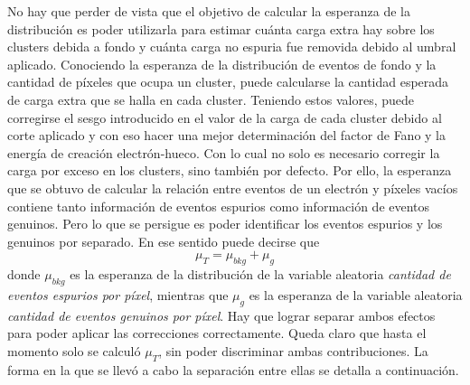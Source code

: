 No hay que perder de vista que el objetivo de calcular la esperanza de la distribución es poder utilizarla para estimar cuánta carga extra hay sobre los clusters debida a fondo y cuánta carga no espuria fue removida debido al umbral aplicado. 
%
Conociendo la esperanza de la distribución de eventos de fondo y la cantidad de píxeles que ocupa un cluster, puede calcularse la cantidad esperada de carga extra que se halla en cada cluster. Teniendo estos valores, puede corregirse el sesgo introducido en el valor de la carga de cada cluster debido al corte aplicado y con eso hacer una mejor determinación del factor de Fano y la energía de creación electrón-hueco.
%
Con lo cual no solo es necesario corregir la carga por exceso en los clusters, sino también por defecto. Por ello, la esperanza que se obtuvo de calcular la relación entre eventos de un electrón y píxeles vacíos contiene tanto información de eventos espurios como información de eventos genuinos. Pero lo que se persigue es poder identificar los eventos espurios y los genuinos por separado. En ese sentido puede decirse que 
\begin{equation*}
    \mu_{T} = \mu_{bkg} + \mu_{g}
\end{equation*}
donde $\mu_{bkg}$ es la esperanza de la distribución de la variable aleatoria \textit{cantidad de eventos espurios por píxel}, mientras que $\mu_{g}$ es la esperanza de la variable aleatoria \textit{cantidad de eventos genuinos por píxel}. Hay que lograr separar ambos efectos para poder aplicar las correcciones correctamente. 
Queda claro que hasta el momento solo se calculó $\mu_{T}$, sin poder discriminar ambas contribuciones. La forma en la que se llevó a cabo la separación entre ellas se detalla a continuación.

